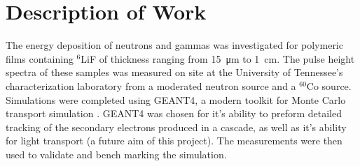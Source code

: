 \documentclass{anstrans}
\newcommand{\iso}[2]{${}^{#2}${#1}}
\begin{document}
\section{Description of Work}
The energy deposition of neutrons and gammas was investigated for polymeric films containing \iso{LiF}{6} of thickness ranging from \SI{15}{\micro \meter} to \SI{1}{\centi \meter}.
The pulse height spectra of these samples was measured on site at the University of Tennessee's characterization laboratory from a moderated neutron source and a \iso{Co}{60} source.
Simulations were completed using GEANT4, a modern toolkit for Monte Carlo transport simulation \cite{agostinelli_geant4simulation_2003,allison_geant4_2006}.
GEANT4 was chosen for it's ability to preform detailed tracking of the secondary electrons produced in a cascade, as well as it's ability for light transport (a future aim of this project).
The measurements were then used to validate and bench marking the simulation.
\end{document}

